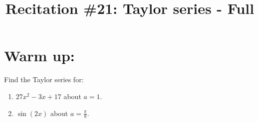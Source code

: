 \documentclass[]{ximera}
\title{Recitation \#21: Taylor series - Full}
\begin{document}
\begin{abstract}		\end{abstract}
\maketitle



\section{Warm up:}
Find the Taylor series for:  
	\begin{enumerate}
	\item  $27x^2 - 3x + 17$ about $a=1$.  
	\item  $\sin(2x)$ about $a = \frac{\pi}{8}$.  
	\end{enumerate}
	
\end{document}
